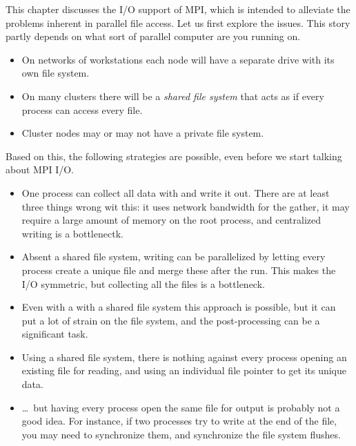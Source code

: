 

This chapter discusses the I/O support of MPI, which is intended
to alleviate the problems inherent in parallel file access.
Let us first explore the issues.
This story partly depends on what sort of parallel
computer are you running on.

\begin{itemize}
\item On networks of workstations each node will have a separate
  drive with its own file system.
\item On many clusters there will be a
  \emph{shared file system}
  that acts as if every process can access every file.
\item Cluster nodes may or may not have a private file system.
\end{itemize}

Based on this, the following strategies are possible, even before
we start talking about MPI I/O.

\begin{itemize}
\item One process can collect all data with 
  and write it out. There are at least three things wrong wit this:
  it uses network bandwidth for the gather, it may require a large
  amount of memory on the root process, and centralized writing
  is a bottlenectk.
\item Absent a shared file system, writing can be parallelized by letting
  every process create a unique file and merge these after the run.
  This makes the I/O symmetric, but collecting all the files is a bottleneck.
\item Even with a with a shared file system this approach is possible,
  but it can put a lot of strain
  on the file system, and the post-processing can be a significant task.
\item Using a shared file system,
  there is nothing against every process opening an existing file
  for reading, and using an individual file pointer to get its unique
  data.
\item \ldots~but having every process open the same file for output is
  probably not a good idea. For instance, if two processes try to write
  at the end of the file, you may need to synchronize them, and synchronize
  the file system flushes.
\end{itemize}

